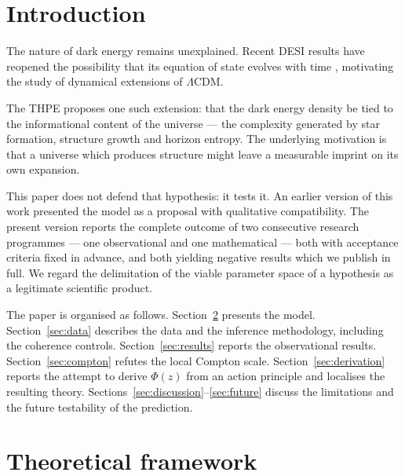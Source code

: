 \documentclass[aps,prd,twocolumn,superscriptaddress,nofootinbib,floatfix]{revtex4-2}
\newcommand{\LCDM}{\ensuremath{\Lambda}CDM}
\begin{document}
\maketitle

\section{Introduction}

The nature of dark energy remains unexplained. Recent DESI results have
reopened the possibility that its equation of state evolves with time
\cite{DESI2024,DESI2025}, motivating the study of dynamical extensions
of \LCDM{}.

The THPE proposes one such extension: that the dark energy density be
tied to the informational content of the universe --- the complexity
generated by star formation, structure growth and horizon entropy. The
underlying motivation is that a universe which produces structure might
leave a measurable imprint on its own expansion.

This paper does not defend that hypothesis: it tests it. An earlier
version of this work presented the model as a proposal with qualitative
compatibility. The present version reports the complete outcome of two
consecutive research programmes --- one observational and one
mathematical --- both with acceptance criteria fixed in advance, and
both yielding negative results which we publish in full. We regard the
delimitation of the viable parameter space of a hypothesis as a
legitimate scientific product.

The paper is organised as follows. Section~\ref{sec:theory} presents
the model. Section~\ref{sec:data} describes the data and the inference
methodology, including the coherence controls. Section~\ref{sec:results}
reports the observational results. Section~\ref{sec:compton} refutes the
local Compton scale. Section~\ref{sec:derivation} reports the attempt to
derive $\Phi(z)$ from an action principle and localises the resulting
theory. Sections~\ref{sec:discussion}--\ref{sec:future} discuss the
limitations and the future testability of the prediction.

\section{Theoretical framework}
\label{sec:theory}
\end{document}
